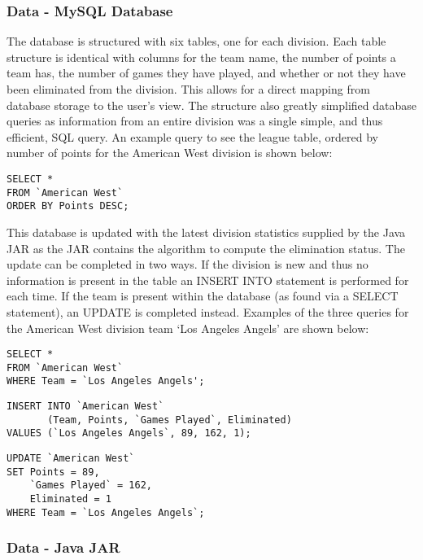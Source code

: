 \subsubsection{Data - MySQL Database}

The database is structured with six tables, one for each division. Each table
structure is identical with columns for the team name, the number of points
a team has, the number of games they have played, and whether or not they have
been eliminated from the division. This allows for a direct mapping from
database storage to the user's view. The structure also greatly simplified 
database queries as information from an entire division was a single simple, and 
thus efficient, SQL query. An example query to see the league table, ordered by 
number of points for the American West division is shown below:

\begin{verbatim}
SELECT *
FROM `American West`
ORDER BY Points DESC;
\end{verbatim}

This database is updated with the latest division statistics supplied by the 
Java JAR as the JAR contains the algorithm to compute the elimination status.
The update can be completed in two ways. If the division is new and thus no
information is present in the table an INSERT INTO statement is performed for
each time. If the team is present within the database (as found via a SELECT
statement), an UPDATE is completed instead. Examples of the three queries
for the American West division team `Los Angeles Angels' are shown below:

\begin{verbatim}
SELECT *
FROM `American West`
WHERE Team = `Los Angeles Angels';
\end{verbatim}

\begin{verbatim}
INSERT INTO `American West`
       (Team, Points, `Games Played`, Eliminated)
VALUES (`Los Angeles Angels`, 89, 162, 1);
\end{verbatim}

\begin{verbatim}
UPDATE `American West`
SET Points = 89,
    `Games Played` = 162,
    Eliminated = 1
WHERE Team = `Los Angeles Angels`;
\end{verbatim}

\subsubsection{Data - Java JAR}

